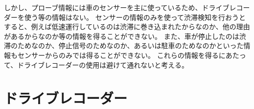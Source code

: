 しかし、プローブ情報には車のセンサーを主に使っているため、ドライブレコーダーを使う等の情報はない。
センサーの情報のみを使って渋滞検知を行おうとすると、例えば低速運行しているのは渋滞に巻き込まれたからなのか、他の理由があるからなのか等の情報を得ることができない。
また、車が停止したのは渋滞のためなのか、停止信号のためなのか、あるいは駐車のためなのかといった情報もセンサーからのみでは得ることができない。
これらの情報を得るにあたって、ドライブレコーダーの使用は避けて通れないと考える。


\section{ドライブレコーダー}
